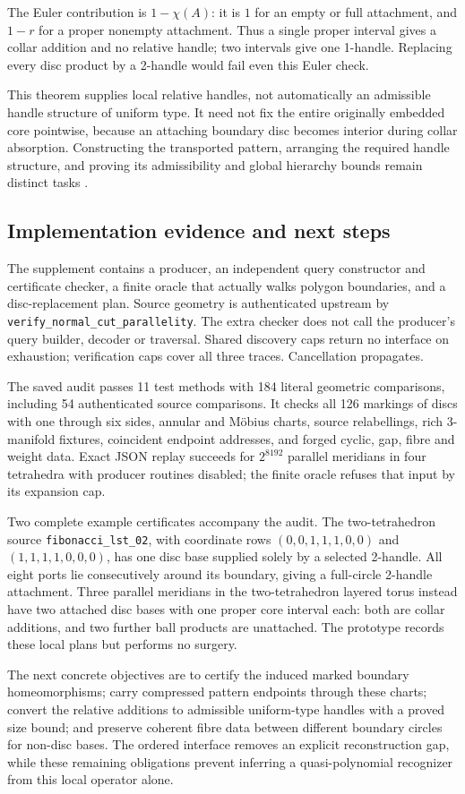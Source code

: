The Euler contribution is $1-\chi(A)$: it is $1$ for an empty or full
attachment, and $1-r$ for a proper nonempty attachment.  Thus a single
proper interval gives a collar addition and no relative handle; two
intervals give one 1-handle.  Replacing every disc product by a 2-handle
would fail even this Euler check.

This theorem supplies local relative handles, not automatically an
admissible handle structure of uniform type.  It need not fix the entire
originally embedded core pointwise, because an attaching boundary disc
becomes interior during collar absorption.  Constructing the transported
pattern, arranging the required handle structure, and proving its
admissibility and global hierarchy bounds remain distinct tasks
\cite{Lackenby2026}.

\subsection{Implementation evidence and next steps}

The supplement contains a producer, an independent query constructor and
certificate checker, a finite oracle that actually walks polygon boundaries,
and a disc-replacement plan.  Source geometry is authenticated upstream by
\texttt{verify\_normal\_cut\_parallelity}.  The extra checker does not call
the producer's query builder, decoder or traversal.  Shared discovery caps
return no interface on exhaustion; verification caps cover all three
traces.  Cancellation propagates.

The saved audit passes 11 test methods with 184 literal geometric comparisons,
including 54 authenticated source comparisons.  It checks all 126 markings
of discs with one through six sides, annular and M\"obius charts, source
relabellings, rich 3-manifold fixtures, coincident endpoint addresses, and
forged cyclic, gap, fibre and weight data.  Exact JSON replay succeeds for
$2^{8192}$ parallel meridians in four tetrahedra with producer routines
disabled; the finite oracle refuses that input by its expansion cap.

Two complete example certificates accompany the audit.  The two-tetrahedron
source \texttt{fibonacci\_lst\_02}, with coordinate rows
$(0,0,1,1,1,0,0)$ and $(1,1,1,1,0,0,0)$, has one disc base supplied solely
by a selected 2-handle.  All eight ports lie consecutively around its
boundary, giving a full-circle 2-handle attachment.  Three parallel
meridians in the two-tetrahedron layered torus instead have two attached
disc bases with one proper core interval each: both are collar additions,
and two further ball products are unattached.  The prototype records these
local plans but performs no surgery.

The next concrete objectives are to certify the induced marked boundary
homeomorphisms; carry compressed pattern endpoints through these charts;
convert the relative additions to admissible uniform-type handles with a
proved size bound; and preserve coherent fibre data between different
boundary circles for non-disc bases.  The ordered interface removes an
explicit reconstruction gap, while these remaining obligations prevent
inferring a quasi-polynomial recognizer from this local operator alone.
